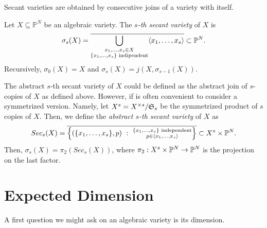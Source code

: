 Secant varieties are obtained by consecutive joins of a variety with itself.
\begin{definition}
\label{classicalAG-definition-secantvariety}
Let $X \subseteq \mathbb{P}^N$ be an algebraic variety. The \emph{$s$-th secant variety} of $X$ is 
\[
    \sigma_s(X) = \overline{\bigcup_{\substack{x_1,\ldots,x_s \in X \\ \{x_1,\ldots,x_s\} \text{ indipendent}}} \langle x_1,\ldots,x_s \rangle} \subset \mathbb{P}^N.
\]
Recursively, $\sigma_0(X) = X$ and $\sigma_s(X) = j(X,\sigma_{s-1}(X))$.

The abstract $s$-th secant variety of $X$ could be defined as the abstract join of $s$-copies of $X$ as defined above. However, if is often convenient to consider a symmetrized version. Namely, let $X^s = X^{\times s} / \mathfrak{S}_s$ be the symmetrized product of $s$ copies of $X$. Then, we define the \emph{abstract $s$-th secant variety} of $X$ as 
\[
    Sec_s(X) = \overline{\left\{(\{x_1,\ldots,x_s\},p) ~:~ \substack{\{x_1,\ldots,x_s\} \text{ independent} \\ p \in \langle x_1,\ldots,x_s \rangle}\right\}} \subset X^s \times \mathbb{P}^N.
\]
Then, $\sigma_s(X) = \pi_2(Sec_s(X))$, where $\pi_2 : X^s \times \mathbb{P}^N \rightarrow \mathbb{P}^N$ is the projection on the last factor.
\end{definition}

\section{Expected Dimension}
\label{classicalAG-section-expectedDimension}
A first question we might ask on an algebraic variety is its dimension. 


